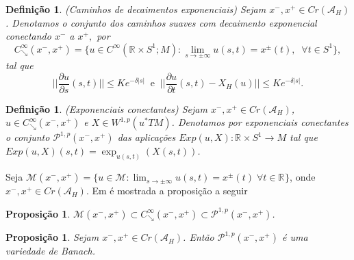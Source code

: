\documentclass[12pt]{book}
\newtheorem{definicao}[teorema]{Definição}
\newtheorem{proposicao}[teorema]{Proposição}
\newcommand{\aplicacaoexponencial}[2]{\exp_{#1}(#2)}
\newcommand{\aplicaoessuavesreatacirculo}{C^{\infty}(\retacartesianocirculo; M)}
\newcommand{\caminhosdecaimentoexponencial}[2]{C^{\infty}_{\searrow}(#1, #2)}
\newcommand{\caminhosdecaimentoexponencialpadrao}{\caminhosdecaimentoexponencial{x^{-}}{x^{+}}}
\newcommand{\caminhosexponenciaisconectantes}[2]{\mathcal{P}^{1,p}(#1, #2)}
\newcommand{\caminhosexponenciaisconectantespadrao}{\caminhosexponenciaisconectantes{x^{-}}{x^{+}}}
\newcommand{\circulo}{S^{1}}
\newcommand{\derivadaparcial}[2]{\frac{\partial #1}{\partial #2}}
\newcommand{\energiafinitaM}{\mathcal{M}}
\newcommand{\energiafinitaMconectante}{\energiafinitaM(x^{-}, x^{+})}
\newcommand{\espacosobolev}[1]{W^{1,p}(#1)}
\newcommand{\funcionalH}{\mathcal{A}_{H}}
\newcommand{\normagrande}[1]{\Big|\Big|#1\Big|\Big|}
\newcommand{\pontoscriticos}[1]{\textit{Cr}(#1)}
\newcommand{\pullbackfibradotangente}[2]{#1^{*}T#2}
\newcommand{\pullbackfibradotangenteM}[1]{\pullbackfibradotangente{#1}{M}}
\newcommand{\retacartesianocirculo}{\real{} \times \circulo}
\newcommand{\real}[1]{\mathbb{R}^{#1}}
\newcommand{\reta}{\real{}}
\begin{document}
	\begin{definicao}\label{definicao_caminhos_decaimentos_exponenciais}
		(Caminhos de decaimentos exponenciais) Sejam $x^{-}, x^{+} \in \pontoscriticos{\funcionalH}$. Denotamos o conjunto dos caminhos suaves com decaimento exponencial conectando $x^{-}$ a $x^{+}, $ por
		$$
		\caminhosdecaimentoexponencialpadrao = \{u \in \aplicaoessuavesreatacirculo: \lim_{s \to \pm \infty} u(s,t) = x^{\pm}(t),\;\;\forall t\in \circulo \},
		$$
		tal que
		$$
		\normagrande{\derivadaparcial{u}{s}(s,t)} \leq Ke^{-\delta|s|} \;\; \text{e} \;\; \normagrande{\derivadaparcial{u}{t}(s,t) -X_{H}(u)} \leq Ke^{-\delta|s|}.
		$$
	\end{definicao}
	
	\begin{definicao}
		(Exponenciais conectantes) Sejam $x^{-}, x^{+} \in \pontoscriticos{\funcionalH}$, $u \in \caminhosdecaimentoexponencialpadrao$ e $X \in \espacosobolev{\pullbackfibradotangenteM{u}}$. Denotamos por exponenciais conectantes  o conjunto $\caminhosexponenciaisconectantespadrao$ das aplicações $Exp(u,X):\retacartesianocirculo \to M$ tal que $Exp(u,X)(s,t) = \aplicacaoexponencial{u(s,t)}{X(s,t)}$.
	\end{definicao}
	
	Seja $\energiafinitaMconectante =\{u\in \energiafinitaM: \lim_{s\to \pm \infty}u(s,t) =x^{\pm}(t)\; \forall t\in \reta \}$, onde $x^{-}, x^{+} \in \pontoscriticos{\funcionalH}$.
	Em \cite{audi_floer_homology} é mostrada a proposição a seguir
	
	\begin{proposicao}\label{proposicao_cadeia_caminhos_conectantes}
		$\energiafinitaMconectante \subset \caminhosdecaimentoexponencialpadrao \subset  \caminhosexponenciaisconectantespadrao$.
	\end{proposicao}
	
	
	\begin{proposicao}\label{proposicao_variedade_banach}
		Sejam $x^{-}, x^{+} \in \pontoscriticos{\funcionalH}$. Então $\caminhosexponenciaisconectantespadrao$ é uma variedade de Banach.
	\end{proposicao}
	
\end{document}
